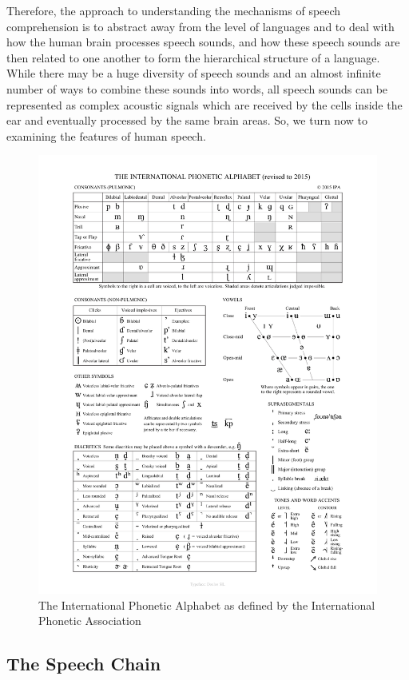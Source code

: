 \documentclass[titlepage]{article}
\begin{document}
  Therefore, the approach to understanding the mechanisms of speech comprehension
  is to abstract away from the level of languages and to deal with how the human
  brain processes speech sounds, and how these speech sounds are then related to one
  another to form the hierarchical structure of a language.
  While there may be a huge diversity of speech sounds and an almost infinite number of ways
  to combine these sounds into words, all speech sounds can be represented as
  complex acoustic signals which are received by the cells inside the ear
  and eventually processed by the same brain areas. So, we turn now to examining the
  features of human speech.


  \begin{figure}
    \centering
    \includegraphics[scale=0.5]{ipaChart}
    \caption{The International Phonetic Alphabet as defined by the International
    Phonetic Association}
    \label{ipaChart}
  \end{figure}

  \subsection{The Speech Chain}
\end{document}
